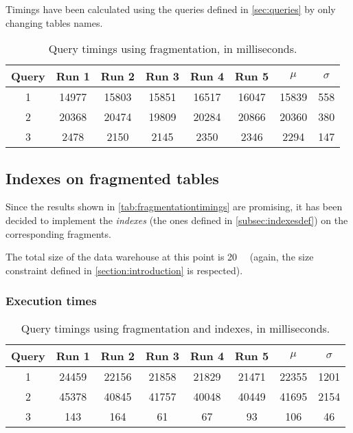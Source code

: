 Timings have been calculated using the queries defined in \autoref{sec:queries} by only changing tables names.

\begin{table}[!h]
\centering
\begin{tabular}{|| c | c c c c c | c c ||} 
 \hline
 Query & Run 1 & Run 2 & Run 3 & Run 4 & Run 5 & 	$\mu$ & $\sigma$ \\ [0.5ex] 
 \hline\hline
 1 & 14977 & 15803 & 15851 & 16517 & 16047 & 15839 & 558 \\ 
 \hline
 2 & 20368 & 20474 & 19809 & 20284 & 20866 & 20360 & 380 \\
 \hline
 3 & 2478 & 2150 & 2145 & 2350 & 2346 & 2294 & 147 \\
 \hline
\end{tabular}
  \caption{Query timings using fragmentation, in milliseconds.}
  \label{tab:fragmentationtimings}
\end{table}



\subsection{Indexes on fragmented tables}

Since the results shown in \autoref{tab:fragmentationtimings} are promising, it has been decided to implement the \textit{indexes} (the ones defined in \autoref{subsec:indexesdef}) on the corresponding fragments.

The total size of the data warehouse at this point is \SI{20}{\giga\byte} (again, the size constraint defined in \autoref{section:introduction} is respected).


\subsubsection{Execution times}


\begin{table}[!h]
\centering
\begin{tabular}{|| c | c c c c c | c c ||} 
 \hline
 Query & Run 1 & Run 2 & Run 3 & Run 4 & Run 5 & 	$\mu$ & $\sigma$ \\ [0.5ex] 
 \hline\hline
 1 & 24459 & 22156 & 21858 & 21829 & 21471 & 22355 & 1201 \\ 
 \hline
 2 & 45378 & 40845 & 41757 & 40048 & 40449 & 41695 & 2154 \\
 \hline
 3 & 143 & 164 & 61 & 67 & 93 & 106 & 46 \\
 \hline
\end{tabular}
  \caption{Query timings using fragmentation and indexes, in milliseconds.}
  \label{tab:fragmentationindexestimings}
\end{table}